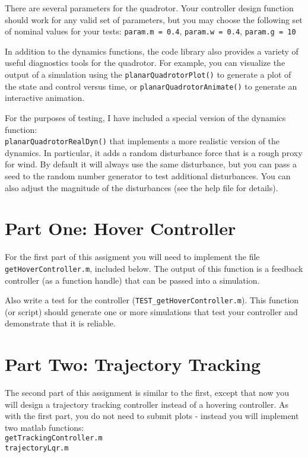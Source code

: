 \par
There are several parameters for the quadrotor. Your controller design function
should work for any valid set of parameters, but you may choose the following
set of nominal values for your tests:
\texttt{param.m = 0.4}, \texttt{param.w = 0.4}, \texttt{param.g = 10}

\par
In addition to the dynamics functions, the code library also provides a variety
of useful diagnostics tools for the quadrotor. For example, you can visualize the
output of a simulation using the
\texttt{planarQuadrotorPlot()} to generate a plot of the state and control versus time,
or \texttt{planarQuadrotorAnimate()} to generate an interactive animation.

\par
For the purposes of testing, I have included a special version of the dynamics
function:\\
\texttt{planarQuadrotorRealDyn()} that implements a more realistic
version of the dynamics. In particular, it adds a random disturbance force that
is a rough proxy for wind. By default it will always use the same disturbance,
but you can pass a seed to the random number generator to test additional disturbances.
You can also adjust the magnitude of the disturbances (see the help file for details).


\section*{Part One: Hover Controller}

For the first part of this assigment you will need to implement the file
\texttt{getHoverController.m}, included below. The output of this function is
a feedback controller (as a function handle) that can be passed into a simulation.

Also write a test for the controller (\texttt{TEST\_getHoverController.m}).
This function (or script) should generate one or more simulations that test
your controller and demonstrate that it is reliable.

\pagebreak


\section*{Part Two: Trajectory Tracking}

The second part of this assignment is similar to the first, except that now you
will design a trajectory tracking controller instead of a hovering controller.
As with the first part, you do not need to submit plots - instead you will
implement two matlab functions: \\
\texttt{getTrackingController.m} \\
\texttt{trajectoryLqr.m} \\

